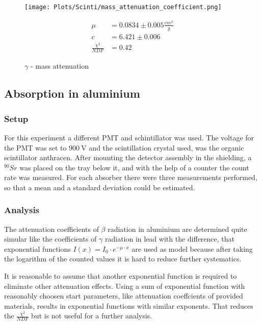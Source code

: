 \documentclass[12pt,twoside,a4paper]{scrartcl}
\begin{document}
        \begin{figure}[H]
					\centering
                \begin{minipage}{0.69 \textwidth}
                    \texttt{[image: Plots/Scinti/mass\_attenuation\_coefficient.png]}
                \end{minipage}
                \begin{minipage}{0.29 \textwidth}
                    \begin{align*}
                        \mu &= 0.0834 \pm 0.005 \frac{cm^2}{g}\\
                        c &= 6.421 \pm 0.006 \\
                        \frac{\chi^2}{NDF} &= 0.42
                    \end{align*}
                \end{minipage}
                \caption{$\gamma$ - mass attenuation}
            \end{figure}


	\subsection{Absorption in aluminium}
	\label{Absorption::Al}
		\subsubsection{Setup}
				For this experiment a different PMT and schintillator was used. The voltage for the PMT was set to $\SI{900}{\volt}$ and the scintillation crystal used, was the organic scintillator anthracen. After mounting the detector assembly in the shielding, a $^{90}Sr$ was placed on the tray below it, and with the help of a counter the count rate was measured. For each absorber there were three measurements performed, so that a mean and a standard deviation could be estimated.

		\subsubsection{Analysis}
        The attenuation coefficients of $\beta$ radiation in aluminium are determined
        quite simular like the coefficients of $\gamma$ radiation in lead with the
        difference, that exponential functions $I(x) = I_0 \cdot e^{- \mu \cdot x}$ are
        used as model because after taking the logarithm of the counted values it is
        hard to reduce further systematics.

        It is reasonable to assume that another exponential function is required to
        eliminate other attenuation effects. Using a sum of exponential function with
        reasonably choosen start parameters, like attenuation coeffcients of provided
        materials, results in exponential functions with similar exponents.
        That reduces the $\frac{\chi^2}{NDF}$ but is not useful for a further
        analysis.
\end{document}
